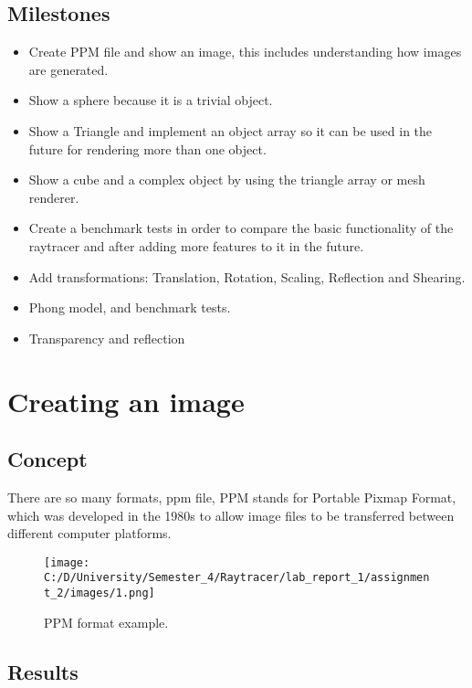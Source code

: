 \documentclass{article}
\begin{document}
\subsection{Milestones}
\label{definitions}
\begin{itemize}
	\item Create PPM file and show an image, this includes understanding how images are generated.
	\item Show a sphere because it is a trivial object.
	\item Show a Triangle and implement an object array so it can be used in the future for rendering more than one object.
	\item Show a cube and a complex object by using the triangle array or mesh renderer.
	\item Create a benchmark tests in order to compare the basic functionality of the raytracer and after adding more features to it in the future.
	\item Add transformations: Translation, Rotation, Scaling, Reflection
	and Shearing.
	\item Phong model, and benchmark tests.
	\item Transparency and reflection
\end{itemize}

 \clearpage

\section{Creating an image}
\subsection{Concept}
There are so many formats, ppm file, PPM stands for Portable Pixmap Format, which was developed in the 1980s to allow image files to be transferred between different computer platforms.

\begin{figure}[H]
	
	\texttt{[image: C:/D/University/Semester\_4/Raytracer/lab\_report\_1/assignment\_2/images/1.png]}
	
	\caption{PPM format example.}
	\label{fig:boat1}
\end{figure}


\subsection{Results}
\end{document}
